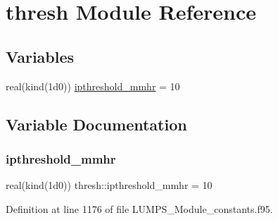 \hypertarget{namespacethresh}{}\section{thresh Module Reference}
\label{namespacethresh}
\subsection*{Variables}
\begin{DoxyCompactItemize}
\item 
real(kind(1d0)) \hyperlink{namespacethresh_ac4cb55bd42fcf4d309abae98b5e7ae49}{ipthreshold\+\_\+mmhr} = 10
\end{DoxyCompactItemize}


\subsection{Variable Documentation}
\mbox{\label{namespacethresh_ac4cb55bd42fcf4d309abae98b5e7ae49}} 
\subsubsection{\texorpdfstring{ipthreshold\+\_\+mmhr}{ipthreshold\_mmhr}}
{\footnotesize\ttfamily real(kind(1d0)) thresh\+::ipthreshold\+\_\+mmhr = 10}



Definition at line 1176 of file L\+U\+M\+P\+S\+\_\+\+Module\+\_\+constants.\+f95.

